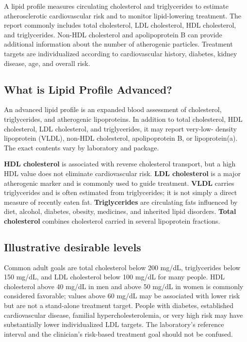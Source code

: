 \documentclass[11pt,openany]{book}
\begin{document}
A lipid profile measures circulating cholesterol and triglycerides to estimate
atherosclerotic cardiovascular risk and to monitor lipid-lowering treatment.
The report commonly includes total cholesterol, LDL cholesterol, HDL
cholesterol, and triglycerides. Non-HDL cholesterol and apolipoprotein B can
provide additional information about the number of atherogenic particles.
Treatment targets are individualized according to cardiovascular history,
diabetes, kidney disease, age, and overall risk.

\subsection*{What is Lipid Profile Advanced?}
An advanced lipid profile is an expanded blood assessment of cholesterol,
triglycerides, and atherogenic lipoproteins. In addition to total cholesterol,
HDL cholesterol, LDL cholesterol, and triglycerides, it may report very-low-
density lipoprotein (VLDL), non-HDL cholesterol, apolipoprotein B, or
lipoprotein(a). The exact contents vary by laboratory and package.

\textbf{HDL cholesterol} is associated with reverse cholesterol transport, but
a high HDL value does not eliminate cardiovascular risk. \textbf{LDL
cholesterol} is a major atherogenic marker and is commonly used to guide
treatment. \textbf{VLDL} carries triglycerides and is often estimated from
triglycerides; it is not simply a direct measure of recently eaten fat.
\textbf{Triglycerides} are circulating fats influenced by diet, alcohol,
diabetes, obesity, medicines, and inherited lipid disorders. \textbf{Total
cholesterol} combines cholesterol carried in several lipoprotein fractions.

\subsection*{Illustrative desirable levels}
Common adult goals are total cholesterol below 200 mg/dL, triglycerides below
150 mg/dL, and LDL cholesterol below 100 mg/dL for many people. HDL cholesterol
above 40 mg/dL in men and above 50 mg/dL in women is commonly considered
favorable; values above 60 mg/dL may be associated with lower risk but are not a
stand-alone treatment target. People with diabetes, established cardiovascular
disease, familial hypercholesterolemia, or very high risk may have substantially
lower individualized LDL targets. The laboratory's reference interval and the
clinician's risk-based treatment goal should not be confused.
\end{document}
